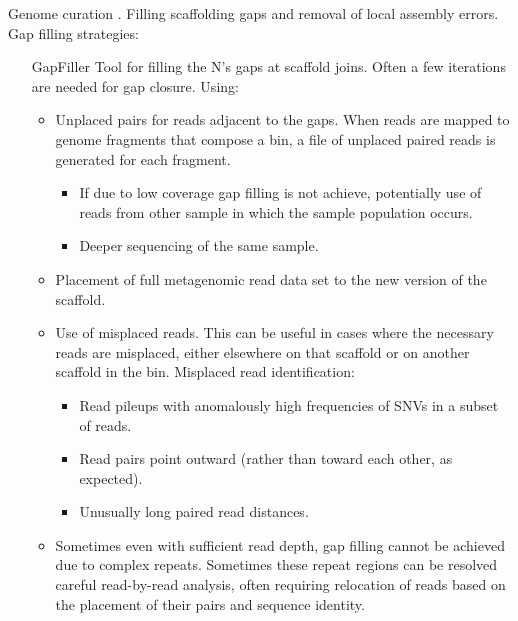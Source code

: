 Genome curation \cite{Hiltemann2023,microbiome-metagenomics-binning}. Filling scaffolding gaps and removal of local assembly 
errors. Gap filling strategies: 
\begin{itemize}
    \item[GapFiller] Tool for filling the N's gaps at scaffold joins. Often a few iterations are needed for gap closure. Using:
    \begin{itemize}
        \item Unplaced pairs for reads adjacent to the gaps. When reads are mapped to genome fragments that compose a bin, a 
        file of unplaced paired reads is generated for each fragment.
        \begin{itemize}
            \item If due to low coverage gap filling is not achieve, potentially use of reads from other sample in which the sample population occurs.
            \item Deeper sequencing of the same sample.
        \end{itemize}
        \item Placement of full metagenomic read data set to the new version of the scaffold.
        \item Use of misplaced reads. This can be useful in cases where the necessary reads are misplaced, either elsewhere 
        on that scaffold or on another scaffold in the bin. Misplaced read identification:
        \begin{itemize}
            \item Read pileups with anomalously high frequencies of SNVs in a subset of reads.
            \item Read pairs point outward (rather than toward each other, as expected).
            \item Unusually long paired read distances.
        \end{itemize}
        \item Sometimes even with sufficient read depth, gap filling cannot be achieved due to complex repeats. 
        Sometimes these repeat regions can be resolved careful read-by-read analysis, often requiring relocation of reads 
        based on the placement of their pairs and sequence identity.
    \end{itemize}
\end{itemize}

